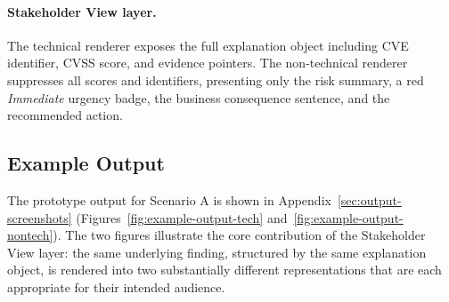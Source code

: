 \paragraph{Stakeholder View layer.} The technical renderer exposes 
the full explanation object including \ac{CVE} identifier, \ac{CVSS} 
score, and evidence pointers. The non-technical renderer suppresses 
all scores and identifiers, presenting only the risk summary, a red 
\textit{Immediate} urgency badge, the business consequence sentence, 
and the recommended action.

\subsection{Example Output}

The prototype output for Scenario A is shown in Appendix~\ref{sec:output-screenshots} (Figures~\ref{fig:example-output-tech} and~\ref{fig:example-output-nontech}). The two figures illustrate the core contribution of the Stakeholder View layer: the same underlying finding, structured by the same explanation object, is rendered into two substantially different representations that are each appropriate for their intended audience.

